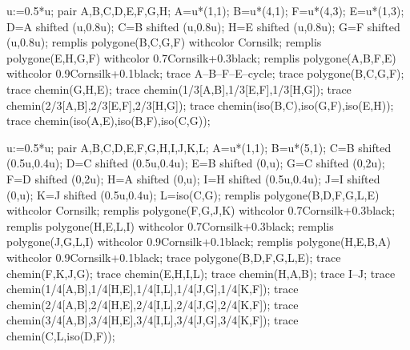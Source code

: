 \begin{remarque}
    \smallskip
    \begin{center}        
        \begin{Geometrie}
            u:=0.5*u;
            pair A,B,C,D,E,F,G,H;
            A=u*(1,1);
            B=u*(4,1);
            F=u*(4,3);
            E=u*(1,3);
            D=A shifted (u,0.8u);
            C=B shifted (u,0.8u);
            H=E shifted (u,0.8u);
            G=F shifted (u,0.8u);
            remplis polygone(B,C,G,F) withcolor Cornsilk;
            remplis polygone(E,H,G,F) withcolor 0.7Cornsilk+0.3black;
            remplis polygone(A,B,F,E) withcolor 0.9Cornsilk+0.1black;
            trace A--B--F--E--cycle;
            trace polygone(B,C,G,F);
            trace chemin(G,H,E);
            trace chemin(1/3[A,B],1/3[E,F],1/3[H,G]);
            trace chemin(2/3[A,B],2/3[E,F],2/3[H,G]);
            trace chemin(iso(B,C),iso(G,F),iso(E,H));
            trace chemin(iso(A,E),iso(B,F),iso(C,G));
        \end{Geometrie}
        \hspace*{20mm}
        \begin{Geometrie}
            u:=0.5*u;
            pair A,B,C,D,E,F,G,H,I,J,K,L;
            A=u*(1,1);
            B=u*(5,1);
            C=B shifted (0.5u,0.4u);
            D=C shifted (0.5u,0.4u);
            E=B shifted (0,u);
            G=C shifted (0,2u);
            F=D shifted (0,2u);
            H=A shifted (0,u);
            I=H shifted (0.5u,0.4u);
            J=I shifted (0,u);
            K=J shifted (0.5u,0.4u);
            L=iso(C,G);
            remplis polygone(B,D,F,G,L,E) withcolor Cornsilk;
            remplis polygone(F,G,J,K) withcolor 0.7Cornsilk+0.3black;
            remplis polygone(H,E,L,I) withcolor 0.7Cornsilk+0.3black;
            remplis polygone(J,G,L,I) withcolor 0.9Cornsilk+0.1black;
            remplis polygone(H,E,B,A) withcolor 0.9Cornsilk+0.1black;            
            trace polygone(B,D,F,G,L,E);
            trace chemin(F,K,J,G);
            trace chemin(E,H,I,L);
            trace chemin(H,A,B);
            trace I--J;
            trace chemin(1/4[A,B],1/4[H,E],1/4[I,L],1/4[J,G],1/4[K,F]);
            trace chemin(2/4[A,B],2/4[H,E],2/4[I,L],2/4[J,G],2/4[K,F]);
            trace chemin(3/4[A,B],3/4[H,E],3/4[I,L],3/4[J,G],3/4[K,F]);
            trace chemin(C,L,iso(D,F));
        \end{Geometrie}
    \end{center}
\end{remarque}